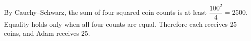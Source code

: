 By Cauchy--Schwarz, the sum of four squared coin counts is at least $\dfrac{100^2}{4}=2500$. Equality holds only when all four counts are equal. Therefore each receives 25 coins, and Adam receives $\boxed{25}$.
